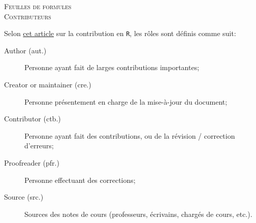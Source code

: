 \documentclass[10pt, french]{article}
\begin{document}
\center %

\textsc{\LARGE Feuilles de formules}\\[0.5cm]
\textsc{\Large Contributeurs}\\[0.5cm] 

\begin{terminologie}[Rôles]
Selon \href{https://journal.r-project.org/archive/2012-1/RJournal_2012-1_Hornik~et~al.pdf}{cet article} sur la contribution en \texttt{R}, les rôles sont définis comme suit:
\begin{description}
	\item[Author (aut.)]	Personne ayant fait de larges contributions importantes;
	\item[Creator or maintainer (cre.)]	Personne présentement en charge de la mise-à-jour du document;
	\item[Contributor (ctb.)]	Personne ayant fait des contributions, ou de la révision / correction d'erreurs;
	\item[Proofreader (pfr.)]	Personne effectuant des corrections;
	\item[Source (src.)]	Sources des notes de cours (professeurs, écrivains, chargés de cours, etc.).
\end{description}
\end{terminologie}

\begin{multicols*}{2}



























\end{multicols*}
\end{document}
